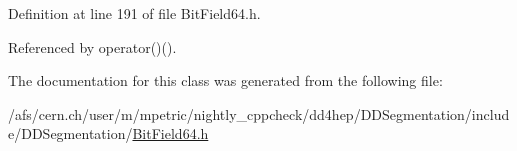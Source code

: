 Definition at line 191 of file BitField64.h.

Referenced by operator()().

The documentation for this class was generated from the following file:\begin{DoxyCompactItemize}
\item 
/afs/cern.ch/user/m/mpetric/nightly\_\-cppcheck/dd4hep/DDSegmentation/include/DDSegmentation/\hyperlink{_d_d_segmentation_2include_2_d_d_segmentation_2_bit_field64_8h}{BitField64.h}\end{DoxyCompactItemize}

